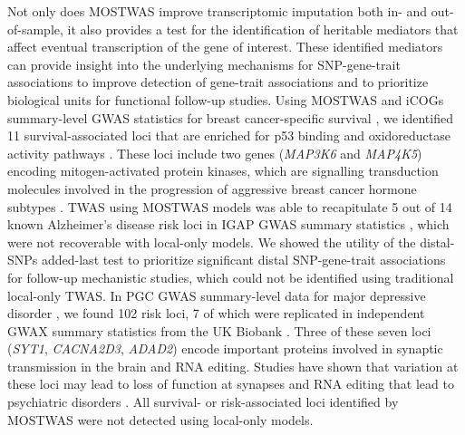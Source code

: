 Not only does MOSTWAS improve
transcriptomic imputation both
in- and out-of-sample, it also provides a test for the 
identification of heritable mediators that affect
eventual transcription of the gene
of interest. These identified mediators
can provide insight into the
underlying mechanisms
for SNP-gene-trait associations
to improve
detection of gene-trait
associations and to prioritize biological units for functional
follow-up studies.
Using MOSTWAS and iCOGs
summary-level GWAS statistics
for breast cancer-specific survival \cite{Guo2015}, we
identified 11 survival-associated loci
that are enriched for p53 binding and
oxidoreductase activity 
pathways \cite{Bao2017P53Context,Zhou2016SystematicState}.
These loci include two genes 
(\textit{MAP3K6} and \textit{MAP4K5}) encoding
mitogen-activated protein kinases, which are 
signalling transduction molecules 
involved in 
the progression of aggressive
breast cancer hormone subtypes
\cite{Ahmad2016ClinicopathologicalCancers}.
TWAS using MOSTWAS models
was able to recapitulate 5 out of 14 known
Alzheimer's disease risk loci
in IGAP GWAS summary statistics
\cite{Lambert2013Meta-analysisDisease},
which were not recoverable
with local-only models.
We showed the utility of 
the distal-SNPs added-last test
to prioritize significant distal SNP-gene-trait
associations
for follow-up mechanistic studies,
which could not be identified 
using traditional local-only TWAS.
In PGC GWAS summary-level data
for major depressive disorder
\cite{Wray2018Genome-wideDepression},
we found 102 risk loci, 7 of which
were replicated in independent
GWAX summary statistics from the UK
Biobank \cite{Liu2017Case-controlDisease}.
Three of these seven loci (\textit{SYT1}, 
\textit{CACNA2D3}, 
\textit{ADAD2})
encode important proteins
involved in synaptic transmission in the brain
and RNA editing. Studies have shown that variation
at these loci may lead to loss
of function at synapses and RNA editing
that lead to psychiatric disorders
\cite{Ryan2006GeneGenes,Baker2015IdentificationCycling,Heyes2015GeneticDisorders,Savva2012TheFamily,Slotkin2013Adenosine-to-inosineDisease}.
All survival- or risk-associated loci identified by MOSTWAS
were not detected using local-only models.

